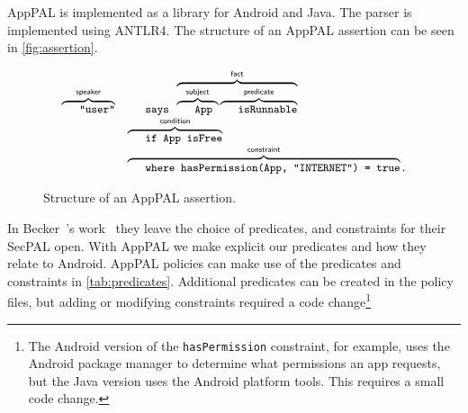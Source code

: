 \documentclass[]{llncs}
\begin{document}
AppPAL is implemented as a library for Android and Java.
The parser is implemented using ANTLR4.
The structure of an AppPAL assertion can be seen in \autoref{fig:assertion}.

\begin{figure}
  \newcommand{\bracetext}[1]{\text{\sffamily #1}}
  \newcommand{\smalltext}[1]{\text{\ttfamily\footnotesize #1}}
  \centering
  \begin{equation*}\small
    \begin{array}{r l}\footnotesize
      \overbrace{\smalltext{"user"}}^{\bracetext{speaker}} &
      \smalltext{ says }\overbrace{\overbrace{\smalltext{ App }}^{\bracetext{subject}}\overbrace{\smalltext{ isRunnable}}^{\bracetext{predicate}}}^{\bracetext{fact}} \\
      & \overbrace{\smalltext{ if App isFree}}^{\bracetext{condition}} \\
      & \overbrace{\smalltext{ where hasPermission(App, "INTERNET") = true}}^{\bracetext{constraint}}.
    \end{array}
  \end{equation*}
  \caption{Structure of an AppPAL assertion.}
\label{fig:assertion}
\end{figure}

In Becker~\etal's work~\cite{Becker:2006vh} they leave the choice of predicates, and constraints for their SecPAL open.
With AppPAL we make explicit our predicates and how they relate to Android.
AppPAL policies can make use of the predicates and constraints in \autoref{tab:predicates}.
Additional predicates can be created in the policy files, but adding or modifying constraints required a code change\footnote{The Android version of the \texttt{hasPermission} constraint, for example, uses the Android package manager to determine what permissions an app requests, but the Java version uses the Android platform tools.  This requires a small code change.}
\end{document}
